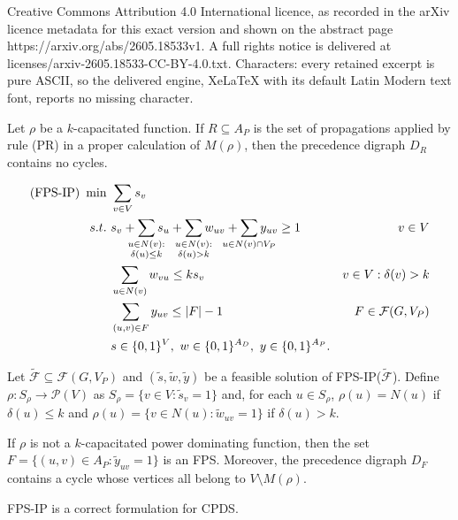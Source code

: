 \documentclass[10pt,a4paper]{amsart}
\newcommand{\FF}{{\mathcal F}}
\newcommand{\FPSIPF}[1]{FPS-IP(#1)}
\newcommand{\FPSIP}{FPS-IP\xspace}
\newcommand{\PP}{{\mathcal P}}
\begin{document}
Creative Commons Attribution 4.0 International licence, as recorded in the arXiv licence metadata for this exact version and shown on the abstract page https://arxiv.org/abs/2605.18533v1. A full rights notice is delivered at licenses/arxiv-2605.18533-CC-BY-4.0.txt. Characters: every retained excerpt is pure ASCII, so the delivered engine, XeLaTeX with its default Latin Modern text font, reports no missing character.
\begin{lemma}\label{lemma.DAG}
Let $\rho$ be a $k$-capacitated function.
If $R \subseteq A_P$ is the set of propagations applied by rule (PR) in a proper calculation of $M(\rho)$, then the precedence digraph $D_R$ contains no cycles.
\end{lemma}

\begin{align}
\text{(\FPSIP)}\ \min\  & \sum_{v \in V} s_v \label{FPSIP.ObjFun}\\
s.t.\  & s_v + \sum_{\mathclap{\substack{u \in N(v):\\\delta(u) \leq k}}} s_u + \sum_{\mathclap{\substack{u \in N(v):\\\delta(u) > k}}} w_{uv} + \sum_{\mathclap{u \in N(v) \cap V_P}} y_{uv} \geq 1 & v \in V \label{FPSIP.R1}\\
& \sum_{u \in N(v)} w_{vu} \leq ks_v & v \in V: \delta(v) > k \label{FPSIP.R2}\\
& \sum_{(u,v) \in F} y_{uv} \leq |F|-1 & F \in \FF(G,V_P) \label{FPSIP.R3}\\
& s \in \{0,1\}^V,\ w \in \{0,1\}^{A_D},\ y \in \{0,1\}^{A_P}. \notag
\end{align}

\begin{lemma}\label{lemma.fps.constraint.generation}
Let $\tilde \FF \subseteq \FF(G,V_P)$ and $(\tilde s, \tilde w, \tilde y)$ be a feasible solution of \FPSIPF{$\tilde \FF$}.
Define $\rho: S_{\rho} \to \PP(V)$ as $S_{\rho} = \{v \in V: \tilde s_v = 1\}$ and, for each $u \in S_{\rho}$, $\rho(u) = N(u)$ if $\delta(u) \leq k$ and $\rho(u) = \{v \in N(u): \tilde w_{uv} = 1\}$ if $\delta(u) > k$.

If $\rho$ is not a $k$-capacitated power dominating function, then the set $F = \{(u,v) \in A_P: \tilde y_{uv} = 1\}$ is an FPS.
Moreover, the precedence digraph $D_F$ contains a  cycle whose vertices all belong to $V \setminus M(\rho)$. 
\end{lemma}

\begin{proposition}\label{prop.FPS.IP}
\FPSIP is a correct formulation for CPDS.
\end{proposition}
\end{document}
